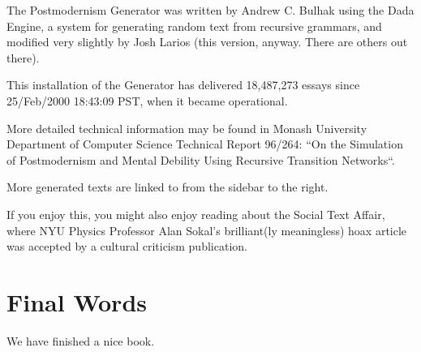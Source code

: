 \documentclass[]{book}
\begin{document}
The Postmodernism Generator was written by Andrew C. Bulhak using the
Dada Engine, a system for generating random text from recursive
grammars, and modified very slightly by Josh Larios (this version,
anyway. There are others out there).

This installation of the Generator has delivered 18,487,273 essays since
25/Feb/2000 18:43:09 PST, when it became operational.

More detailed technical information may be found in Monash University
Department of Computer Science Technical Report 96/264: ``On the
Simulation of Postmodernism and Mental Debility Using Recursive
Transition Networks``.

More generated texts are linked to from the sidebar to the right.

If you enjoy this, you might also enjoy reading about the Social Text
Affair, where NYU Physics Professor Alan Sokal's brilliant(ly
meaningless) hoax article was accepted by a cultural criticism
publication.

\hypertarget{final-words}{%
\chapter{Final Words}\label{final-words}}

We have finished a nice book.


\end{document}
